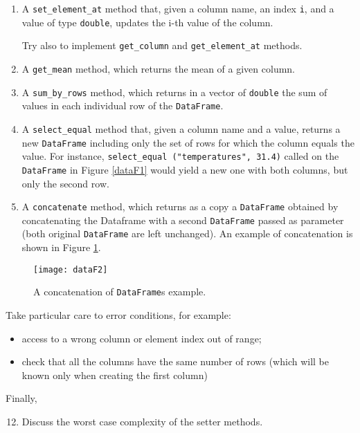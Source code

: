 \begin{enumerate}
\item A \texttt{set\_element\_at} method that, given a column name, an index \texttt{i}, and a value of type \texttt{double}, updates the i-th value of the column.

Try also to implement \texttt{get\_column} and \texttt{get\_element\_at} methods.

\item A \texttt{get\_mean} method, which returns the mean of a given column.

\item A \texttt{sum\_by\_rows} method, which returns in a vector of \texttt{double} the sum of values in each individual row of the \texttt{DataFrame}.

\item A \texttt{select\_equal} method that, given a column name and a value, returns a new \texttt{DataFrame} including only the set of rows for which the column equals the value. For instance,
\texttt{select\_equal ("temperatures", 31.4)} called on the \texttt{DataFrame} in Figure \ref{dataF1} would yield a new one with both columns, but only the second row.

\item A \texttt{concatenate} method, which returns as a copy a \texttt{DataFrame} obtained by concatenating the Dataframe with a second \texttt{DataFrame} passed as parameter (both original \texttt{DataFrame} are left unchanged). An example of concatenation is shown in Figure \ref{dataF2}.
\end{enumerate}

\begin{figure}[h]
\begin{center}
  \texttt{[image: dataF2]}
\end{center}
\caption{A concatenation of \texttt{DataFrame}s example.}
\label{dataF2}
\end{figure}

Take particular care to error conditions, for example:
\begin{itemize}
    \item access to a wrong column or element index out of range;
    \item check that all the columns have the same number of rows (which will be known only when creating the first column)
\end{itemize}

Finally,
\begin{enumerate}
\setcounter{enumi}{11}
\item Discuss the worst case complexity of the setter methods.
\end{enumerate}

